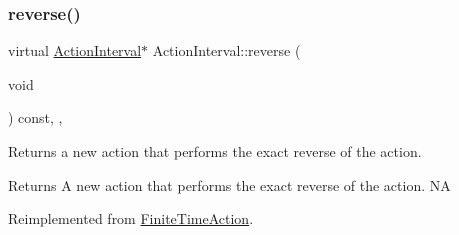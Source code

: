 \mbox{\label{classActionInterval_a9f9ac7164036a0bc261a72f62a2b2da7}} 
\subsubsection{\texorpdfstring{reverse()}{reverse()}\hspace{0.1cm}{\footnotesize\ttfamily [2/2]}}
{\footnotesize\ttfamily virtual \hyperlink{classActionInterval}{Action\+Interval}$\ast$ Action\+Interval\+::reverse (\begin{DoxyParamCaption}\item[{void}]{ }\end{DoxyParamCaption}) const\hspace{0.3cm}{\ttfamily [inline]}, {\ttfamily [override]}, {\ttfamily [virtual]}}

Returns a new action that performs the exact reverse of the action.

\begin{DoxyReturn}{Returns}
A new action that performs the exact reverse of the action.  NA 
\end{DoxyReturn}


Reimplemented from \hyperlink{classFiniteTimeAction_a886bbdd2dc82167fe6ffae664c22dacc}{Finite\+Time\+Action}.



